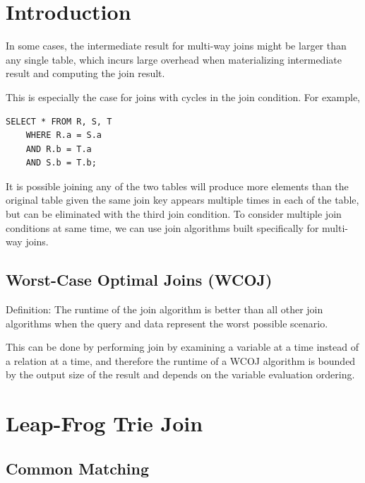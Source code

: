 \documentclass[11pt]{article}
\begin{document}
\maketitle
\thispagestyle{plain}

\section{Introduction}

In some cases, the intermediate result for multi-way joins might be larger than any single table, which incurs large overhead when materializing intermediate result and computing the join result. 

This is especially the case for joins with cycles in the join condition. For example,

\begin{verbatim}
SELECT * FROM R, S, T
	WHERE R.a = S.a
    AND R.b = T.a
    AND S.b = T.b;
\end{verbatim}

It is possible joining any of the two tables will produce more elements than the original table given the same join key appears multiple times in each of the table, but can be eliminated with the third join condition. To consider multiple join conditions at same time, we can use join algorithms built specifically for multi-way joins.

\subsection{Worst-Case Optimal Joins (WCOJ)}

Definition: The runtime of the join algorithm is better than all other join algorithms when the query and data represent the worst possible scenario.

This can be done by performing join by examining a variable at a time instead of a relation at a time, and therefore the runtime of a WCOJ algorithm is bounded by the output size of the result and depends on the variable evaluation ordering.

\section{Leap-Frog Trie Join}

\subsection{Common Matching}
\end{document}

